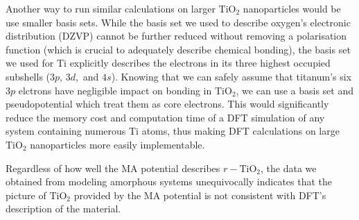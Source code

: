 \documentclass[aps,prb,twocolumn,amsmath,amssymb,superscriptaddress,longbibliography]{revtex4-1}
\newcommand\tab[1][1cm]{\hspace*{#1}} %
\begin{document}
\tab Another way to run similar calculations on larger $\text{TiO}_2$ nanoparticles would be use smaller basis sets.
While the basis set we used to describe oxygen's electronic distribution (DZVP) cannot be further reduced without removing a polarisation function (which is crucial to adequately describe chemical bonding), the basis set we used for Ti explicitly describes the electrons in its three highest occupied subshells ($3p,\,3d,$ and $4s$).
Knowing that we can safely assume that titanum's six $3p$ elctrons have negligible impact on bonding in $\text{TiO}_2$\cite{electronic_structure}, we can use a basis set and pseudopotential which treat them as core electrons.
This would significantly reduce the memory cost and computation time of a DFT simulation of any system containing numerous Ti atoms, thus making DFT calculations on large $\text{TiO}_2$ nanoparticles more easily implementable.

\tab Regardless of how well the MA potential describes $r-\text{TiO}_2$, the data we obtained from modeling amorphous systems unequivocally indicates that the picture of $\text{TiO}_2$ provided by the MA potential is not consistent with DFT's description of the material.

 
\end{document}

